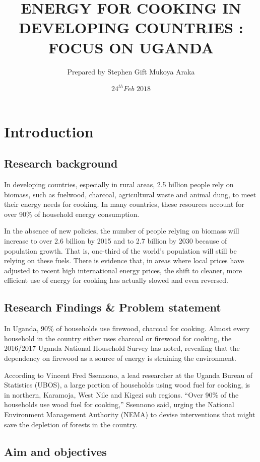 \documentclass[12pt, a4paper]{article}
\title{ENERGY FOR COOKING IN DEVELOPING COUNTRIES : FOCUS ON UGANDA}
\author{Prepared by Stephen Gift Mukoya Araka}
\date{$24^{th} Feb$ $2018$}
\begin{document}
\maketitle
\clearpage
\section{Introduction}
\subsection{Research background}
In developing countries, especially in rural areas, 2.5 billion people rely on biomass, such as fuelwood, charcoal, agricultural waste and animal dung, to meet their energy needs for cooking. In many countries, these resources account for over 90\% of household energy consumption.

In the absence of new policies, the number of people relying on biomass will increase to over 2.6 billion by 2015 and to 2.7 billion by 2030 because of population growth. That is, one-third of the world’s population will still be relying on these fuels. There is evidence that, in areas where local prices have adjusted to recent high international energy prices, the shift to cleaner, more efficient use of energy for cooking has actually slowed and even reversed.
 
\subsection{Research Findings \& Problem statement}
In Uganda, 90\% of households use firewood, charcoal for cooking.
Almost every household in the country either uses charcoal or firewood for cooking, the 2016/2017 Uganda National Household Survey has noted, revealing that the dependency on firewood as a source of energy is straining the environment.

According to Vincent Fred Ssennono, a lead researcher at the Uganda Bureau of Statistics (UBOS), a large portion of households using wood fuel for cooking, is in northern, Karamoja, West Nile and Kigezi sub regions.
“Over 90\% of the households use wood fuel for cooking,” Ssennono said, urging the National Environment Management Authority (NEMA) to devise interventions that might save the depletion of forests in the country.

\subsection{Aim and objectives}
\end{document}
